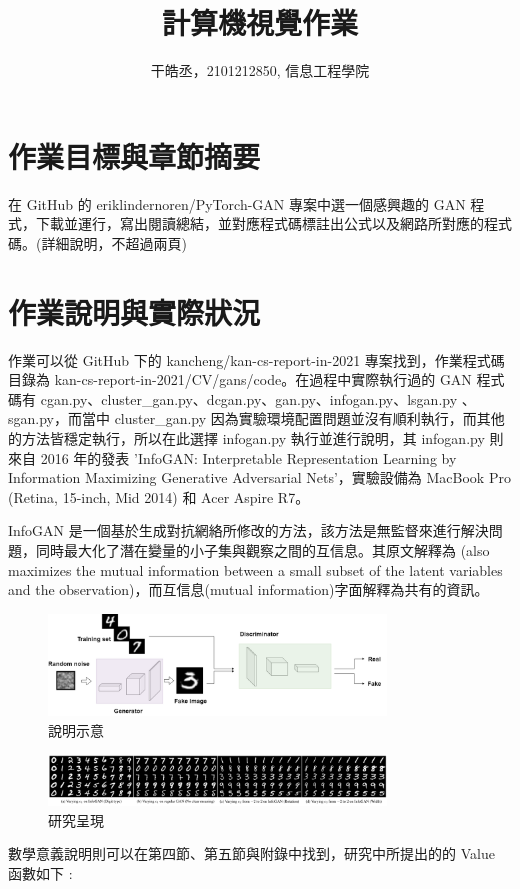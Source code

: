 \documentclass[10pt,UTF8]{ctexart}
\title{計算機視覺作業}
\author{干皓丞，2101212850, 信息工程學院}
\begin{document}
\maketitle


\section{作業目標與章節摘要}

在 GitHub 的 eriklindernoren/PyTorch-GAN 專案中選一個感興趣的 GAN 程式，下載並運行，寫出閱讀總結，並對應程式碼標註出公式以及網路所對應的程式碼。(詳細說明，不超過兩頁)

\section{作業說明與實際狀況}

作業可以從 GitHub 下的 kancheng/kan-cs-report-in-2021 專案找到，作業程式碼目錄為 kan-cs-report-in-2021/CV/gans/code。在過程中實際執行過的 GAN 程式碼有 cgan.py、cluster\_gan.py、dcgan.py、gan.py、infogan.py、lsgan.py 、sgan.py，而當中 cluster\_gan.py 因為實驗環境配置問題並沒有順利執行，而其他的方法皆穩定執行，所以在此選擇 infogan.py 執行並進行說明，其 infogan.py 則來自 2016 年的發表 'InfoGAN: Interpretable Representation Learning by Information Maximizing Generative Adversarial Nets'，實驗設備為 MacBook Pro (Retina, 15-inch, Mid 2014) 和 Acer Aspire R7。

InfoGAN 是一個基於生成對抗網絡所修改的方法，該方法是無監督來進行解決問題，同時最大化了潛在變量的小子集與觀察之間的互信息。其原文解釋為 (also maximizes the mutual information between a small subset of the latent variables and the observation)，而互信息(mutual information)字面解釋為共有的資訊。

\begin{figure}[H]
\centering 
\includegraphics[width=0.80\textwidth]{su1.png} 
\caption{說明示意}
\label{Test}
\end{figure}
\begin{figure}[H]
\centering 
\includegraphics[width=0.80\textwidth]{su2.png} 
\caption{研究呈現}
\label{Test}
\end{figure}
數學意義說明則可以在第四節、第五節與附錄中找到，研究中所提出的的 Value 函數如下 :
\end{document}
